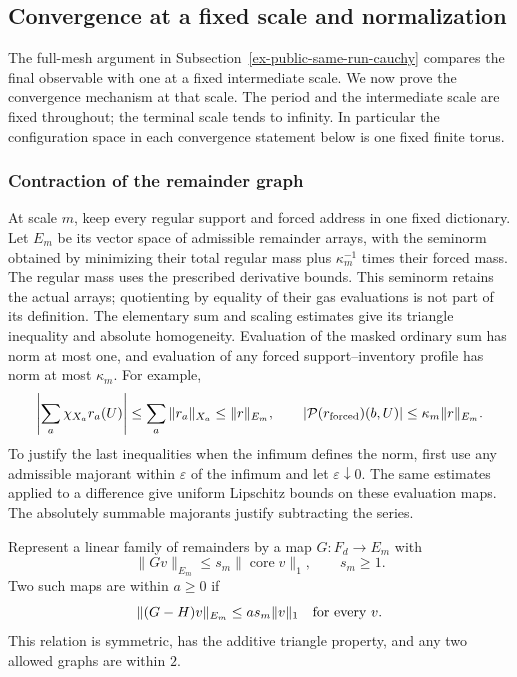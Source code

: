\subsection{Convergence at a fixed scale and normalization}
\label{sec:fixed-rung-convergence}
The full-mesh argument in Subsection~\ref{ex-public-same-run-cauchy}
compares the final observable with one at a fixed intermediate scale.
We now prove the convergence mechanism at that scale. The period and
the intermediate scale are fixed throughout; the terminal scale tends
to infinity. In particular the configuration space in each convergence
statement below is one fixed finite torus.

\subsubsection{Contraction of the remainder graph}
At scale $m$, keep every regular support and forced address in one
fixed dictionary. Let $E_m$ be its vector space of admissible remainder
arrays, with the seminorm obtained by minimizing their total regular
mass plus $\kappa_m^{-1}$ times their forced mass. The regular mass
uses the prescribed derivative bounds. This seminorm retains the
actual arrays; quotienting by equality of their gas evaluations is
not part of its definition. The elementary sum and scaling estimates
give its triangle inequality and absolute homogeneity. Evaluation of
the masked ordinary sum has norm at most one, and evaluation of any
forced support--inventory profile has norm at most $\kappa_m$.
For example,
\[
 \left|\sum_a\chi_{X_a}r_a(U)\right|
 \le\sum_a\|r_a\|_{X_a}\le\|r\|_{E_m},\qquad
 |\mathcal P(r_{\rm forced})(b,U)|\le\kappa_m\|r\|_{E_m}.
\]
To justify the last inequalities when the infimum defines the norm,
first use any admissible majorant within $\varepsilon$ of the infimum
and let $\varepsilon\downarrow0$. The same estimates applied to a
difference give uniform Lipschitz bounds on these evaluation maps.
The absolutely summable majorants justify subtracting the series.

Represent a linear family of remainders by a map
$G:F_d\to E_m$ with
\[
                  \|Gv\|_{E_m}\le s_m\|\operatorname{core}v\|_1,
                  \qquad s_m\ge1.
\]
Two such maps are within $a\ge0$ if
\[
             \|(G-H)v\|_{E_m}\le a s_m\|v\|_1
                         \quad\hbox{for every }v.
\]
This relation is symmetric, has the additive triangle property,
and any two allowed graphs are within $2$.

